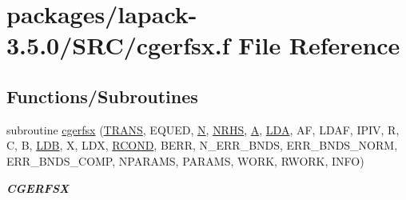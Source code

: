 \hypertarget{cgerfsx_8f}{}\section{packages/lapack-\/3.5.0/\+S\+R\+C/cgerfsx.f File Reference}
\label{cgerfsx_8f}
\subsection*{Functions/\+Subroutines}
\begin{DoxyCompactItemize}
\item 
subroutine \hyperlink{group__complexGEcomputational_ga1cc6317bb51919b658efa7bc80f286c2}{cgerfsx} (\hyperlink{superlu__enum__consts_8h_a0c4e17b2d5cea33f9991ccc6a6678d62a1f61e3015bfe0f0c2c3fda4c5a0cdf58}{T\+R\+A\+N\+S}, E\+Q\+U\+E\+D, \hyperlink{polmisc_8c_a0240ac851181b84ac374872dc5434ee4}{N}, \hyperlink{example__user_8c_aa0138da002ce2a90360df2f521eb3198}{N\+R\+H\+S}, \hyperlink{classA}{A}, \hyperlink{example__user_8c_ae946da542ce0db94dced19b2ecefd1aa}{L\+D\+A}, A\+F, L\+D\+A\+F, I\+P\+I\+V, R, C, B, \hyperlink{example__user_8c_a50e90a7104df172b5a89a06c47fcca04}{L\+D\+B}, X, L\+D\+X, \hyperlink{superlu__enum__consts_8h_af00a42ecad444bbda75cde1b64bd7e72a9b5c151728d8512307565994c89919d5}{R\+C\+O\+N\+D}, B\+E\+R\+R, N\+\_\+\+E\+R\+R\+\_\+\+B\+N\+D\+S, E\+R\+R\+\_\+\+B\+N\+D\+S\+\_\+\+N\+O\+R\+M, E\+R\+R\+\_\+\+B\+N\+D\+S\+\_\+\+C\+O\+M\+P, N\+P\+A\+R\+A\+M\+S, P\+A\+R\+A\+M\+S, W\+O\+R\+K, R\+W\+O\+R\+K, I\+N\+F\+O)
\begin{DoxyCompactList}\small\item\em {\bfseries C\+G\+E\+R\+F\+S\+X} \end{DoxyCompactList}\end{DoxyCompactItemize}
